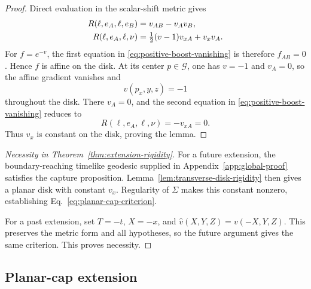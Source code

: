\documentclass[10pt]{article}
\begin{document}
\begin{proof}
Direct evaluation in the scalar-shift metric gives
\begin{align}
  R(\ell,e_A,\ell,e_B)&=v_{AB}-v_Av_B,\notag\\
  R(\ell,e_A,\ell,\nu)&=\tfrac12(v-1)v_{xA}+v_xv_A.
  \label{eq:transverse-rigidity-curvature}
\end{align}
For \(f=e^{-v}\), the first equation in
\eqref{eq:positive-boost-vanishing} is therefore \(f_{AB}=0\).  Hence \(f\) is
affine on the disk.  At its center \(p\in\mathcal G\), one has \(v=-1\) and
\(v_A=0\), so the affine gradient vanishes and
\begin{equation}
  v(p_x,y,z)=-1
  \label{eq:forced-planar-wall}
\end{equation}
throughout the disk.  There \(v_A=0\), and the second equation in
\eqref{eq:positive-boost-vanishing} reduces to
\begin{equation}
  R(\ell,e_A,\ell,\nu)=-v_{xA}=0.
  \label{eq:forced-constant-kappa}
\end{equation}
Thus \(v_x\) is constant on the disk, proving the lemma.
\end{proof}

\begin{proof}[Necessity in Theorem~\ref{thm:extension-rigidity}]
For a future extension, the boundary-reaching timelike geodesic supplied in
Appendix~\ref{app:global-proof} satisfies the capture proposition.
Lemma~\ref{lem:transverse-disk-rigidity} then gives a planar disk with constant
\(v_x\).  Regularity of \(\Sigma\) makes this constant nonzero, establishing
Eq.~\eqref{eq:planar-cap-criterion}.

For a past extension, set \(T=-t\), \(X=-x\), and
\(\widehat v(X,Y,Z)=v(-X,Y,Z)\).  This preserves the metric form and all
hypotheses, so the future argument gives the same criterion.  This proves
necessity.
\end{proof}

\subsection{Planar-cap extension}
\label{app:cap-attachment}
\end{document}
